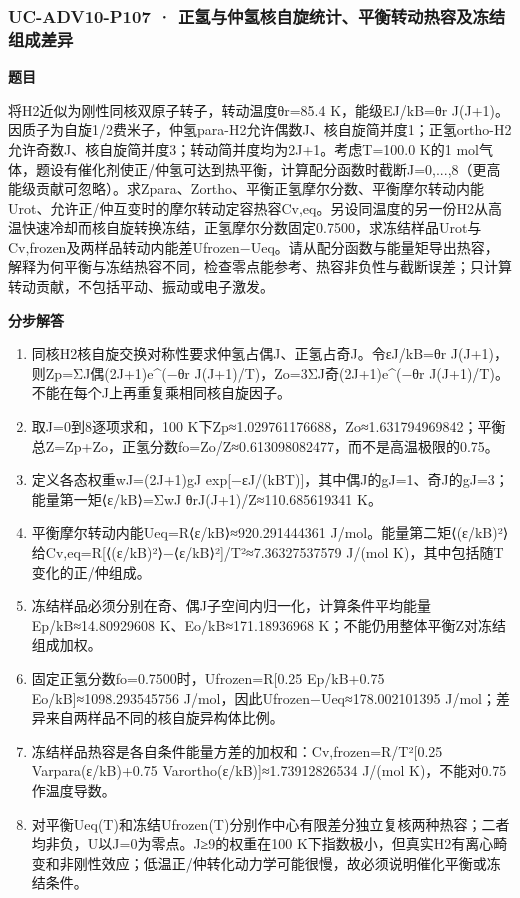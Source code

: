 \documentclass[UTF8,11pt,a4paper]{ctexart}
\begin{document}
\subsubsection*{UC-ADV10-P107 · 正氢与仲氢核自旋统计、平衡转动热容及冻结组成差异}
\noindent\textbf{题目}\par
将H2近似为刚性同核双原子转子，转动温度θr=85.4 K，能级EJ/kB=θr J(J+1)。因质子为自旋1/2费米子，仲氢para-H2允许偶数J、核自旋简并度1；正氢ortho-H2允许奇数J、核自旋简并度3；转动简并度均为2J+1。考虑T=100.0 K的1 mol气体，题设有催化剂使正/仲氢可达到热平衡，计算配分函数时截断J=0,...,8（更高能级贡献可忽略）。求Zpara、Zortho、平衡正氢摩尔分数、平衡摩尔转动内能Urot、允许正/仲互变时的摩尔转动定容热容Cv,eq。另设同温度的另一份H2从高温快速冷却而核自旋转换冻结，正氢摩尔分数固定0.7500，求冻结样品Urot与Cv,frozen及两样品转动内能差Ufrozen−Ueq。请从配分函数与能量矩导出热容，解释为何平衡与冻结热容不同，检查零点能参考、热容非负性与截断误差；只计算转动贡献，不包括平动、振动或电子激发。\par
\medskip\noindent\textbf{分步解答}
\begin{enumerate}
\item 同核H2核自旋交换对称性要求仲氢占偶J、正氢占奇J。令εJ/kB=θr J(J+1)，则Zp=ΣJ偶(2J+1)e\textasciicircum{}(−θr J(J+1)/T)，Zo=3ΣJ奇(2J+1)e\textasciicircum{}(−θr J(J+1)/T)。不能在每个J上再重复乘相同核自旋因子。
\item 取J=0到8逐项求和，100 K下Zp≈1.029761176688，Zo≈1.631794969842；平衡总Z=Zp+Zo，正氢分数fo=Zo/Z≈0.613098082477，而不是高温极限的0.75。
\item 定义各态权重wJ=(2J+1)gJ exp[−εJ/(kBT)]，其中偶J的gJ=1、奇J的gJ=3；能量第一矩⟨ε/kB⟩=ΣwJ θrJ(J+1)/Z≈110.685619341 K。
\item 平衡摩尔转动内能Ueq=R⟨ε/kB⟩≈920.291444361 J/mol。能量第二矩⟨(ε/kB)²⟩给Cv,eq=R[⟨(ε/kB)²⟩−⟨ε/kB⟩²]/T²≈7.36327537579 J/(mol K)，其中包括随T变化的正/仲组成。
\item 冻结样品必须分别在奇、偶J子空间内归一化，计算条件平均能量Ep/kB≈14.80929608 K、Eo/kB≈171.18936968 K；不能仍用整体平衡Z对冻结组成加权。
\item 固定正氢分数fo=0.7500时，Ufrozen=R[0.25 Ep/kB+0.75 Eo/kB]≈1098.293545756 J/mol，因此Ufrozen−Ueq≈178.002101395 J/mol；差异来自两样品不同的核自旋异构体比例。
\item 冻结样品热容是各自条件能量方差的加权和：Cv,frozen=R/T²[0.25 Varpara(ε/kB)+0.75 Varortho(ε/kB)]≈1.73912826534 J/(mol K)，不能对0.75作温度导数。
\item 对平衡Ueq(T)和冻结Ufrozen(T)分别作中心有限差分独立复核两种热容；二者均非负，U以J=0为零点。J≥9的权重在100 K下指数极小，但真实H2有离心畸变和非刚性效应；低温正/仲转化动力学可能很慢，故必须说明催化平衡或冻结条件。
\end{enumerate}
\end{document}

